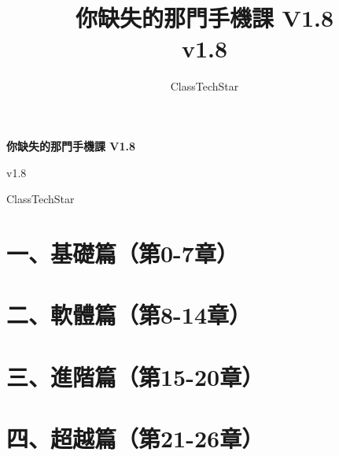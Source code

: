 \documentclass[11pt,a4paper,openany]{book}
\title{你缺失的那門手機課 V1.8\\ \large v1.8}
\author{ClassTechStar}
\date{}
\begin{document}
\begin{titlepage}
\centering
\vspace*{0.28\textheight}
{\Huge\bfseries 你缺失的那門手機課 V1.8\par}
\vspace{1.2em}
{\Large v1.8\par}
\vfill
{\large ClassTechStar\par}
\end{titlepage}
\frontmatter
\tableofcontents
\mainmatter
\part*{一、基礎篇（第0-7章）}










\part*{二、軟體篇（第8-14章）}








\part*{三、進階篇（第15-20章）}







\part*{四、超越篇（第21-26章）}







\end{document}

